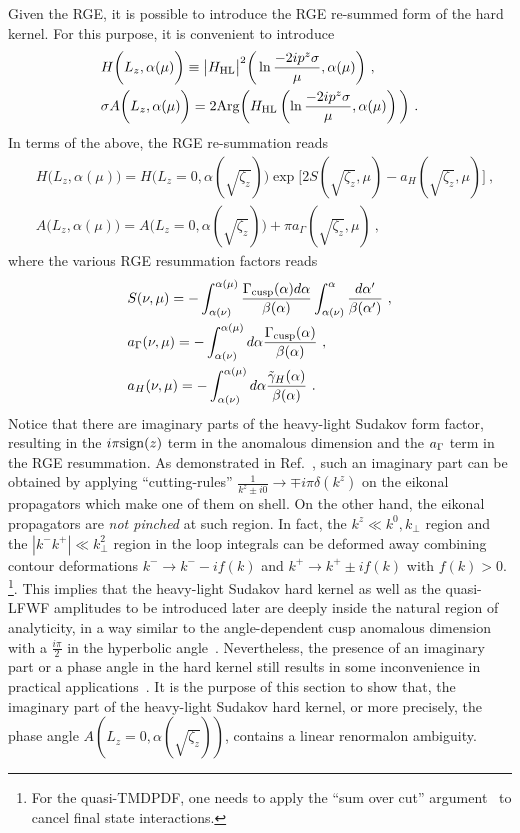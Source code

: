 \documentclass[a4paper,11pt]{article}
\begin{document}
Given the RGE, it is possible to introduce the RGE re-summed form of the hard kernel. For this purpose, it is convenient to introduce
\begin{align}\label{eq:hardabs}
 &H\bigg(L_z,\alpha(\mu)\bigg) \equiv \big|H_{\rm HL}\big|^2\bigg(\ln \frac{-2i p^z \sigma }{\mu},\alpha(\mu) \bigg)\ , \\
 & \sigma A\bigg(L_z,\alpha(\mu)\bigg)=2{\rm Arg}\bigg(H_{\rm HL}\left(\ln \frac{-2i p^z \sigma }{\mu},\alpha(\mu)\right)\bigg) \ . \label{eq:defJf}
\end{align}
In terms of the above, the RGE re-summation reads~\cite{Ji:2023pba}
\begin{align}
&H\bigg(L_z,\alpha(\mu)\bigg)=H
\bigg(L_z=0,\alpha(\sqrt{\zeta_z})\bigg)\exp \bigg[2S(\sqrt{\zeta_z},\mu)-a_{H}(\sqrt{\zeta_z},\mu)\bigg] \ , \\ 
&A\bigg(L_z,\alpha(\mu)\bigg)=A\bigg(L_z=0,\alpha(\sqrt{\zeta_z})\bigg)+\pi a_{\Gamma}(\sqrt{\zeta_z},\mu) \ , \label{eq:phaseRG}
\end{align}
where the various RGE resummation factors reads~\cite{Becher:2006mr} 
\begin{align}\label{eq:aGamma}
&S(\nu,\mu)=-\int_{\alpha(\nu)}^{\alpha(\mu)}\frac{\Gamma_{\rm cusp}(\alpha)d\alpha}{\beta(\alpha)}\int_{\alpha(\nu)}^{\alpha}\frac{d\alpha'}{\beta(\alpha')} \ , \\ 
&a_{\rm \Gamma}(\nu,\mu)=-\int_{\alpha(\nu)}^{\alpha(\mu)} d\alpha\frac{\Gamma_{\rm cusp}(\alpha)}{\beta(\alpha)}  \ , \\
&a_{H}(\nu,\mu)=-\int_{\alpha(\nu)}^{\alpha(\mu)} d\alpha\frac{\tilde \gamma_H(\alpha)}{\beta(\alpha)} \ .
\end{align}
Notice that there are imaginary parts of the heavy-light Sudakov form factor, resulting in the $i\pi{\rm sign}(z)$ term in the anomalous dimension and the $a_{\rm \Gamma}$ term in the RGE resummation. As demonstrated in Ref.~\cite{Ji:2021znw}, such an imaginary part can be obtained by applying ``cutting-rules''  $\frac{1}{k^z \pm i0} \rightarrow \mp i\pi\delta(k^z)$ on the eikonal propagators which make one of them on shell. On the other hand, the eikonal propagators are {\it not pinched} at such region. In fact, the $k^z \ll k^0,k_\perp$ region and the $|k^-k^+| \ll k_\perp^2$ region in the loop integrals can be deformed away combining contour deformations $k^- \rightarrow k^- - if(k)$ and $k^+\rightarrow k^+ \pm i f(k)$ with $f(k)>0$. \footnote{For the quasi-TMDPDF, one needs to apply the ``sum over cut'' argument~\cite{Collins:2011zzd} to cancel final state interactions.}. This implies that the heavy-light Sudakov hard kernel as well as the quasi-LFWF amplitudes to be introduced later are deeply inside the natural region of analyticity, in a way similar to the angle-dependent cusp anomalous dimension with a $\frac{i\pi}{2}$ in the hyperbolic angle~\cite{Korchemsky:1987wg}. 
Nevertheless, the presence of an imaginary part or a phase angle in the hard kernel still results in some inconvenience in practical applications~\cite{LatticePartonLPC:2023pdv,Avkhadiev:2023poz}. It is the purpose of this section to show that, the imaginary part of the heavy-light Sudakov hard kernel, or more precisely, the phase angle $A(L_z=0,\alpha(\sqrt{\zeta_z}))$, contains a linear renormalon ambiguity.
\end{document}
